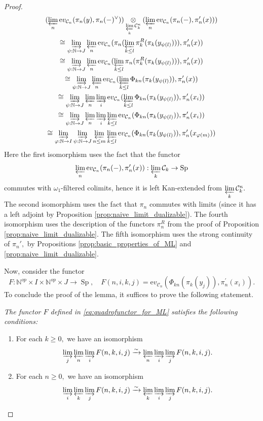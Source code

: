 \documentclass[11pt,leqno]{amsart}
\numberwithin{equation}{section}
\def\N{\mathbb{N}}
\newcommand{\tens}[1]{%
  \mathbin{\mathop{\otimes}\displaylimits_{#1}}%
}
\newcommand{\indlim}[1][]{\mathop{\varinjlim}\limits_{#1}}
\newcommand{\prolim}[1][]{\mathop{\varprojlim}\limits_{#1}}
\newcommand{\xto}{\xrightarrow}
\newcommand{\ev}{\mathrm ev}
\newcommand{\cC}{{\mathcal C}}
\newcommand{\Sp}{\operatorname{Sp}}
\begin{document}
\begin{proof}
\begin{multline}\label{eq:expr_for_tricky_tensor_product_ML}
(\prolim[n]\ev_{\cC_n}(\pi_n(y),\pi_n(-)^{\vee}))\tens{\prolim[k]\cC_k^{\kappa}} (\prolim[n]\ev_{\cC_n}(\pi_n(-),\pi_n^\prime(x)))\\
\cong \indlim[\psi:\N\to J] \prolim[n]\ev_{\cC_n}(\pi_n(\prolim[k\leq l]\pi_k^R(\pi_k(y_{\psi(l)}))),\pi_n^\prime(x))\\
\cong \indlim[\psi:\N\to J] \prolim[n]\ev_{\cC_n}(\prolim[k\leq l]\pi_n(\pi_k^R(\pi_k(y_{\psi(l)}))),\pi_n^\prime(x))\\
\cong \indlim[\psi:\N\to J] \prolim[n]\ev_{\cC_n}(\prolim[k\leq l]\Phi_{kn}(\pi_k(y_{\psi(l)})),\pi_n^\prime(x))\\
\cong \indlim[\psi:\N\to J] \prolim[n]\indlim[i]\ev_{\cC_n}(\prolim[k\leq l]\Phi_{kn}(\pi_k(y_{\psi(l)})),\pi_n^\prime(x_i))\\
\cong \indlim[\psi:\N\to J] \prolim[n]\indlim[i]\prolim[k\leq l] \ev_{\cC_n}(\Phi_{kn}(\pi_k(y_{\psi(l)})),\pi_n^\prime(x_i))\\
\cong \indlim[\varphi:\N\to I]\indlim[\psi:\N\to J]\prolim[n\leq m]\prolim[k\leq l] \ev_{\cC_n}(\Phi_{kn}(\pi_k(y_{\psi(l)})),\pi_n^\prime(x_{\varphi(m)}))
\end{multline}
Here the first isomorphism uses the fact that the functor
\begin{equation*}
\prolim[n]\ev_{\cC_n}(\pi_n(-),\pi_n'(x)):\prolim[k]\cC_k\to\Sp
\end{equation*}
commutes with $\omega_1$-filtered colimits, hence it is left Kan-extended from $\prolim[k]\cC_k^{\kappa}.$ The second isomorphism uses the fact that $\pi_n$ commutes with limits (since it has a left adjoint by Proposition \ref{prop:naive_limit_dualizable}). The fourth isomorphism uses the description of the functors $\pi_n^R$ from the proof of Proposition \ref{prop:naive_limit_dualizable}. The fifth isomorphism uses the strong continuity of $\pi_n',$ by Propositions \ref{prop:basic_properties_of_ML} and \ref{prop:naive_limit_dualizable}.

Now, consider the functor
\begin{equation}\label{eq:quadrofunctor_for_ML}
F:\N^{op}\times I\times\N^{op}\times J\to\Sp,\quad F(n,i,k,j)=\ev_{\cC_n}(\Phi_{kn}(\pi_k(y_j)),\pi_n^\prime(x_i)).\end{equation}
To conclude the proof of the lemma, it suffices to prove the following statement.

{} {\it The functor $F$ defined in \eqref{eq:quadrofunctor_for_ML} satisfies the following conditions:
\begin{enumerate}[label=(\roman*),ref=(\roman*)]
\item For each $k\geq 0,$ we have an isomorphism $$\indlim[j]\prolim[n]\indlim[i]F(n,k,i,j)\xto{\sim} \prolim[n]\indlim[i]\indlim[j]F(n,k,i,j).$$ \label{assump1}
\item For each $n\geq 0,$ we have an isomorphism $$\indlim[i]\prolim[k]\indlim[j]F(n,k,i,j)\xto{\sim} \prolim[k]\indlim[i]\indlim[j]F(n,k,i,j).$$ \label{assump2}
\end{enumerate}
}


\end{proof}
\end{document}

